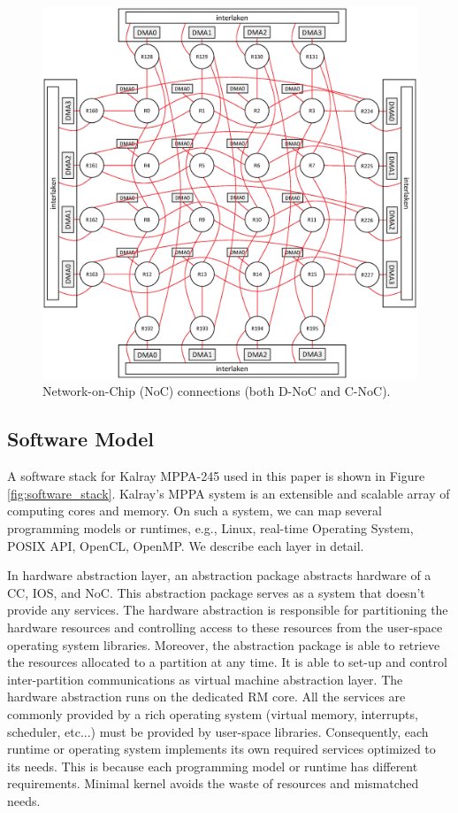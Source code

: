 \documentclass{sig-alternate-05-2015}
\begin{document}
\begin{figure}[t]
  \centering
  \includegraphics[width=1.0\linewidth]{../figure/noc_map.eps}
  \caption{\label{fig:noc_map}
    Network-on-Chip (NoC) connections (both D-NoC and C-NoC).}
\end{figure}

\subsection{Software Model}
\label{sec:software_model}
A software stack for Kalray MPPA-245 used in this paper is shown in Figure \ref{fig:software_stack}.
Kalray's MPPA system is an extensible and scalable array of computing cores and memory.
On such a system, we can map several programming models or runtimes, e.g., Linux, real-time Operating System, POSIX API, OpenCL, OpenMP.
We describe each layer in detail.

In hardware abstraction layer, an abstraction package abstracts hardware of a CC, IOS, and NoC.
This abstraction package serves as a system that doesn't provide any services.
The hardware abstraction is responsible for partitioning the hardware resources and controlling access to these resources from the user-space operating system libraries.
Moreover, the abstraction package is able to retrieve the resources allocated to a partition at any time.
It is able to set-up and control inter-partition communications as virtual machine abstraction layer.
The hardware abstraction runs on the dedicated RM core.
All the services are commonly provided by a rich operating system (virtual memory, interrupts, scheduler, etc...) must be provided by user-space libraries.
Consequently, each runtime or operating system implements its own required services optimized to its needs.
This is because each programming model or runtime has different requirements.
Minimal kernel avoids the waste of resources and mismatched needs.
\end{document}
